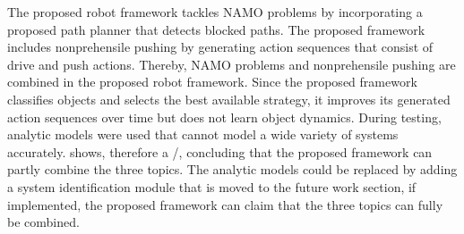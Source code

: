 The proposed robot framework tackles \ac{NAMO} problems by incorporating a proposed path planner that detects blocked paths. The proposed framework includes nonprehensile pushing by generating action sequences that consist of drive and push actions. Thereby, \ac{NAMO} problems and nonprehensile pushing are combined in the proposed robot framework. Since the proposed framework classifies objects and selects the best available strategy, it improves its generated action sequences over time but does not learn object dynamics. During testing, analytic models were used that cannot model a wide variety of systems accurately.  shows, therefore a \xmark/\cmark, concluding that the proposed framework can partly combine the three topics. The analytic models could be replaced by adding a system identification module that is moved to the future work section, if implemented, the proposed framework can claim that the three topics can fully be combined.\bs
